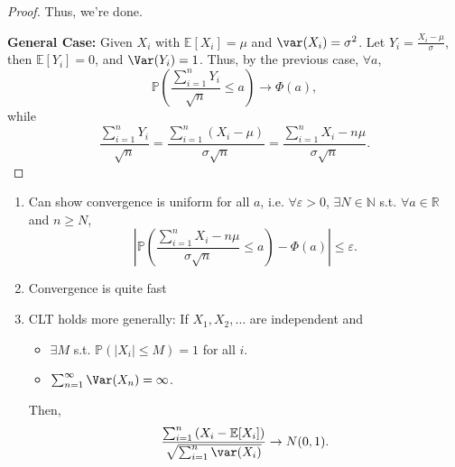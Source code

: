 \begin{proof}
    Thus, we're done. 

    \textbf{General Case:} Given \(X_i\) with \(\mathbb{E} [X_i] = \mu \) and \(\var(X_i) = \sigma ^2\). Let \(Y_i = \frac{X_i - \mu}{\sigma }\), then \(\mathbb{E} [Y_i] = 0\), and \(\Var(Y_i) = 1\). Thus, by the previous case, \(\forall a\), 
    \[
        \mathbb{P} \left( \frac{\sum_{i=1}^n Y_i }{\sqrt{n} } \le a \right) \to \Phi(a), 
    \]        
    while 
    \[
        \frac{\sum_{i=1}^n Y_i }{\sqrt{n} } = \frac{\sum_{i=1}^n (X_i - \mu)  }{\sigma \sqrt{n} } = \frac{\sum_{i=1}^n X_i - n \mu  }{\sigma \sqrt{n} }.
    \]
\end{proof}

\begin{remark}
\quad
    \begin{enumerate}
        \item Can show convergence is uniform for all \(a\), i.e. \(\forall \varepsilon > 0\), \(\exists N \in \mathbb{N}\) s.t. \(\forall a \in \mathbb{R}\) and \(n \ge N\), 
        \[
            \left\vert \mathbb{P} \left( \frac{\sum_{i=1}^n X_i - n \mu }{\sigma \sqrt{n} } \le a\right) - \Phi (a)  \right\vert \le \varepsilon. 
        \]     
        \item Convergence is quite fast
        \item CLT holds more generally: If \(X_1, X_2, \dots \) are independent and 
        \begin{itemize}
            \item \(\exists M\) s.t. \(\mathbb{P} \left( \vert X_i \vert \le M  \right) = 1 \) for all \(i\). 
            \item \(\sum_{n=1}^{\infty} \Var(X_n) = \infty \).    
        \end{itemize}
        Then,
        \[
            \frac{\sum_{i=1}^n \left( X_i - \mathbb{E} [X_i] \right)  }{\sqrt{\sum_{i=1}^n \var(X_i) } } \to N(0, 1).
        \]
    \end{enumerate}
\end{remark}

